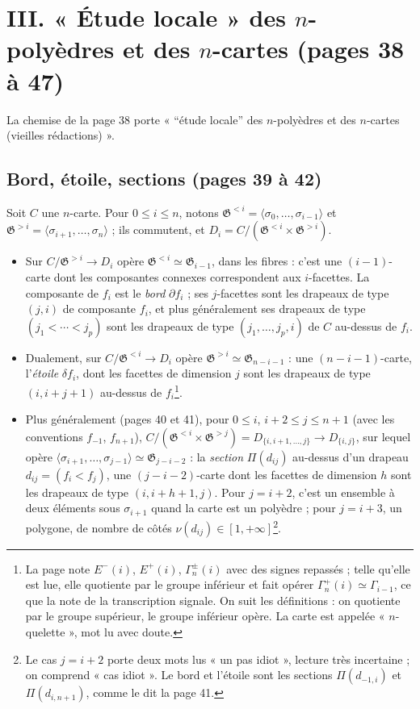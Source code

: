 \documentclass[11pt,a4paper]{article}
\begin{document}
\section*{III. « Étude locale » des $n$-polyèdres et des $n$-cartes (pages 38 à 47)}

La chemise de la page 38 porte « “étude locale” des $n$-polyèdres et des
$n$-cartes (vieilles rédactions) ».

\subsection*{Bord, étoile, sections (pages 39 à 42)}

Soit $C$ une $n$-carte. Pour $0 \leq i \leq n$, notons $\mathfrak{G}^{<i} =
\langle \sigma_0, \dots, \sigma_{i-1} \rangle$ et $\mathfrak{G}^{>i} = \langle
\sigma_{i+1}, \dots, \sigma_n \rangle$ ; ils commutent, et $D_i = C /
(\mathfrak{G}^{<i} \times \mathfrak{G}^{>i})$.
\begin{itemize}
  \item Sur $C / \mathfrak{G}^{>i} \to D_i$ opère $\mathfrak{G}^{<i} \simeq
    \mathfrak{G}_{i-1}$, dans les fibres : c'est une $(i-1)$-carte dont les
    composantes connexes correspondent aux $i$-facettes. La composante de $f_i$
    est le \emph{bord} $\partial f_i$ ; ses $j$-facettes sont les drapeaux de
    type $(j, i)$ de composante $f_i$, et plus généralement ses drapeaux de
    type $(j_1 < \cdots < j_p)$ sont les drapeaux de type $(j_1, \dots, j_p,
    i)$ de $C$ au-dessus de $f_i$.
  \item Dualement, sur $C / \mathfrak{G}^{<i} \to D_i$ opère $\mathfrak{G}^{>i}
    \simeq \mathfrak{G}_{n-i-1}$ : une $(n-i-1)$-carte, l'\emph{étoile}
    $\delta f_i$, dont les facettes de dimension $j$ sont les drapeaux de type
    $(i, i + j + 1)$ au-dessus de $f_i$\footnote{La page note $E^{-}(i)$,
    $E^{+}(i)$, $\Gamma_n^{\pm}(i)$ avec des signes repassés ; telle qu'elle
    est lue, elle quotiente par le groupe inférieur et fait opérer
    $\Gamma_n^{+}(i) \simeq \Gamma_{i-1}$, ce que la note de la transcription
    signale. On suit les définitions : on quotiente par le groupe supérieur, le
    groupe inférieur opère. La carte est appelée « $n$-quelette », mot lu avec
    doute.}.
  \item Plus généralement (pages 40 et 41), pour $0 \leq i$, $i + 2 \leq j \leq
    n + 1$ (avec les conventions $f_{-1}$, $f_{n+1}$), $C / (\mathfrak{G}^{<i}
    \times \mathfrak{G}^{>j}) = D_{\{i, i+1, \dots, j\}} \to D_{\{i, j\}}$, sur
    lequel opère $\langle \sigma_{i+1}, \dots, \sigma_{j-1} \rangle \simeq
    \mathfrak{G}_{j-i-2}$ : la \emph{section} $\Pi(d_{ij})$ au-dessus d'un
    drapeau $d_{ij} = (f_i < f_j)$, une $(j - i - 2)$-carte dont les facettes de
    dimension $h$ sont les drapeaux de type $(i, i + h + 1, j)$. Pour $j = i
    + 2$, c'est un ensemble à deux éléments sous $\sigma_{i+1}$ quand la carte
    est un polyèdre ; pour $j = i + 3$, un polygone, de nombre de côtés
    $\nu(d_{ij}) \in [1, +\infty]$\footnote{Le cas $j = i + 2$ porte deux mots
    lus « un pas idiot », lecture très incertaine ; on comprend « cas idiot ».
    Le bord et l'étoile sont les sections $\Pi(d_{-1,i})$ et $\Pi(d_{i,n+1})$,
    comme le dit la page 41.}.
\end{itemize}
\end{document}
